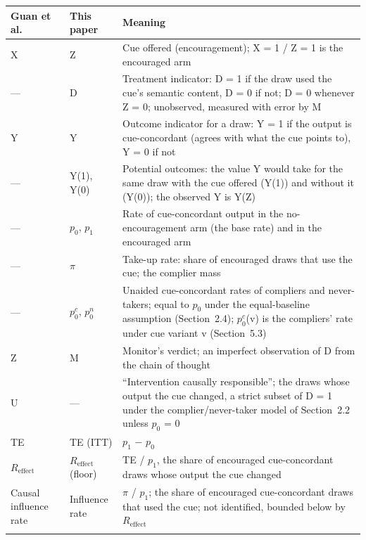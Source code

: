 \documentclass[11pt]{article}
\begin{document}
\begin{table}[H]
  \centering\small
  \begin{tabularx}{\linewidth}{@{}>{\raggedright\arraybackslash}p{2.4cm}>{\raggedright\arraybackslash}p{2.2cm}X@{}}
    \toprule
    Guan et al. & This paper & Meaning \\
    \midrule
    X & Z & Cue offered (encouragement); X = 1 / Z = 1 is the encouraged arm \\ \addlinespace[3pt]
    — & D & Treatment indicator: D = 1 if the draw used the cue’s semantic content, D = 0 if not; D = 0 whenever Z = 0; unobserved, measured with error by M \\ \addlinespace[3pt]
    Y & Y & Outcome indicator for a draw: Y = 1 if the output is cue-concordant (agrees with what the cue points to), Y = 0 if not \\ \addlinespace[3pt]
    — & Y(1), Y(0) & Potential outcomes: the value Y would take for the same draw with the cue offered (Y(1)) and without it (Y(0)); the observed Y is Y(Z) \\ \addlinespace[3pt]
    — & $p_0$, $p_1$ & Rate of cue-concordant output in the no-encouragement arm (the base rate) and in the encouraged arm \\ \addlinespace[3pt]
    — & $\pi$ & Take-up rate: share of encouraged draws that use the cue; the complier mass \\ \addlinespace[3pt]
    — & $p_0^{c}$, $p_0^{n}$ & Unaided cue-concordant rates of compliers and never-takers; equal to $p_0$ under the equal-baseline assumption (Section~2.4); $p_0^{c}$(v) is the compliers’ rate under cue variant v (Section~5.3) \\ \addlinespace[3pt]
    Z & M & Monitor’s verdict; an imperfect observation of D from the chain of thought \\ \addlinespace[3pt]
    U & — & “Intervention causally responsible”; the draws whose output the cue changed, a strict subset of D = 1 under the complier/never-taker model of Section~2.2 unless $p_0$ = 0 \\ \addlinespace[3pt]
    TE & TE (ITT) & $p_1$ $-$ $p_0$ \\ \addlinespace[3pt]
    $R_{\mathrm{effect}}$ & $R_{\mathrm{effect}}$ (floor) & TE / $p_1$, the share of encouraged cue-concordant draws whose output the cue changed \\ \addlinespace[3pt]
    Causal influence rate & Influence rate & $\pi$ / $p_1$; the share of encouraged cue-concordant draws that used the cue; not identified, bounded below by $R_{\mathrm{effect}}$ \\ \addlinespace[3pt]

\end{tabularx}
\end{table}
\end{document}
